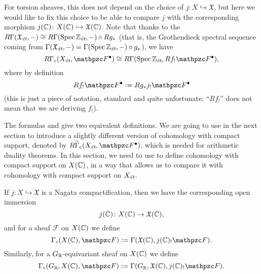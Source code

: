 For torsion sheaves, this does not depend on the choice of
$j\colon X \hookrightarrow \mathfrak{X}$, but here we would like to fix this
choice to be able to compare $j$ with the corresponding morphism
$j (\mathbb{C})\colon X (\mathbb{C}) \hookrightarrow \mathfrak{X} (\mathbb{C})$. Note that thanks to
the 
$R\Gamma (\mathfrak{X}_\text{\it ét}, -) \cong R\Gamma (\operatorname{Spec} \mathbb{Z}_\text{\it ét}, -)\circ R g_*$
(that is, the Grothendieck spectral sequence coming from
$\Gamma (\mathfrak{X}_\text{\it ét}, -) = \Gamma (\operatorname{Spec} \mathbb{Z}_\text{\it ét}, -) \circ g_*$),
we have
\begin{equation}
  \label{eqn:RGammac-via-derived-lower-shriek}
  R\Gamma_c (X_\text{\it ét}, \mathcal{F}^\bullet) \isom
  R\Gamma (\Spec \ZZ_\text{\it \'et}, R f_! \mathcal{F}^\bullet),
\end{equation}
where by definition
$$R f_! \mathcal{F}^\bullet \dfn R g_* j_! \mathcal{F}^\bullet$$
(this is just a piece of notation, standard and quite unfortunate;
``$R f_!$'' does not mean that we are deriving $f_!$).

The formulas  and
 give two equivalent
definitions. We are going to use 
in the next section to introduce a slightly different version of cohomology with
compact support, denoted by
$R\widehat{\Gamma}_c (X_\text{\it ét}, \mathcal{F}^\bullet)$, which is needed
for arithmetic duality theorems. In this section, we need to use
 to define cohomology with compact
support on $X (\mathbb{C})$, in a way that allows us to compare it with cohomology with
compact support on $X_\text{\it ét}$.

\begin{definition}
  If $j\colon X\hookrightarrow \mathfrak{X}$ is a Nagata compactification, then
  we have the corresponding open immersion
  $$j (\mathbb{C})\colon X (\mathbb{C}) \to \mathfrak{X} (\mathbb{C}),$$
  and for a sheaf $\mathcal{F}$ on $X (\mathbb{C})$ we define
  \[ \Gamma_c (X (\CC), \mathcal{F}) \dfn
    \Gamma (\mathfrak{X} (\CC), j (\CC)_! \mathcal{F}). \]
  Similarly, for a $G_{\mathbb{R}}$-equivariant sheaf on $X (\mathbb{C})$ we define
  \[ \Gamma_c (G_\RR, X (\CC), \mathcal{F}) \dfn
    \Gamma (G_\RR, \mathfrak{X} (\CC), j (\CC)_! \mathcal{F}). \]
\end{definition}

